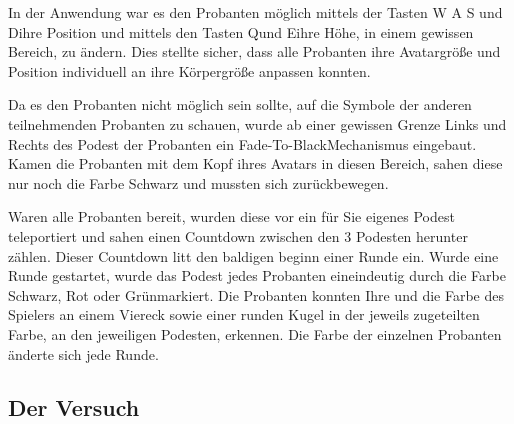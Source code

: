 \documentclass[a4paper,11pt]{article}%
\renewcommand{\\}{\vspace*{0.5\baselineskip} \newline}
\begin{document}
In der Anwendung war es den Probanten möglich mittels der Tasten \flqq W A S und D\frqq ihre Position und mittels den Tasten \flqq Q\frqq und \flqq E\frqq ihre Höhe, in einem gewissen Bereich, zu ändern. Dies stellte sicher, dass alle Probanten ihre Avatargröße und Position individuell an ihre Körpergröße anpassen konnten.

Da es den Probanten nicht möglich sein sollte, auf die Symbole der anderen teilnehmenden Probanten zu schauen, wurde ab einer gewissen Grenze Links und Rechts des Podest der Probanten ein \flqq Fade-To-Black\frqq Mechanismus eingebaut. Kamen die Probanten mit dem Kopf ihres Avatars in diesen Bereich, sahen diese nur noch die Farbe Schwarz und mussten sich zurückbewegen.

Waren alle Probanten bereit, wurden diese vor ein für Sie eigenes Podest teleportiert und sahen einen Countdown zwischen den 3 Podesten herunter zählen. Dieser Countdown litt den baldigen beginn einer Runde ein.
Wurde eine Runde gestartet, wurde das Podest jedes Probanten eineindeutig durch die Farbe \flqq Schwarz, Rot oder Grün\frqq markiert. Die Probanten konnten Ihre und die Farbe des Spielers an einem Viereck sowie einer runden Kugel in der jeweils zugeteilten Farbe, an den jeweiligen Podesten, erkennen. Die Farbe der einzelnen Probanten änderte sich jede Runde.

	\subsection{Der Versuch}
\end{document}
